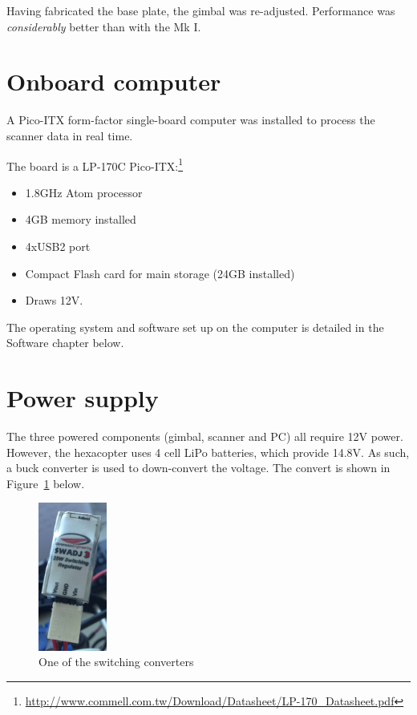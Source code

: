 \documentclass[12pt,oneside,a4paper]{book}
\begin{document}
Having fabricated the base plate, the gimbal was
re-adjusted. Performance was \emph{considerably} better than with the
Mk I.
\newpage
\section{Onboard computer}
\label{sec:onboard-computer}

A Pico-ITX form-factor single-board computer was installed to process
the scanner data in real time. 

The board is a LP-170C Pico-ITX:\footnote{\url{http://www.commell.com.tw/Download/Datasheet/LP-170_Datasheet.pdf}}
\begin{itemize}
\item 1.8GHz Atom processor
\item 4GB memory installed
\item 4xUSB2 port
\item Compact Flash card for main storage (24GB installed)
\item Draws 12V.
\end{itemize}

The operating system and software set up on the computer is detailed
in the Software chapter below.
\newpage
\section{Power supply}
\label{sec:power-supply-cons}

The three powered components (gimbal, scanner and PC) all require 12V
power. However, the hexacopter uses 4 cell LiPo batteries, which
provide 14.8V. As such, a buck converter is used to down-convert the
voltage. The convert is shown in
Figure~\ref{fig:converter} below.

\begin{figure}[h!]
  \centering
  \includegraphics[width=0.2\textwidth]{figs/converter}
  \caption{One of the switching converters}
  \label{fig:converter}
\end{figure}
\end{document}
